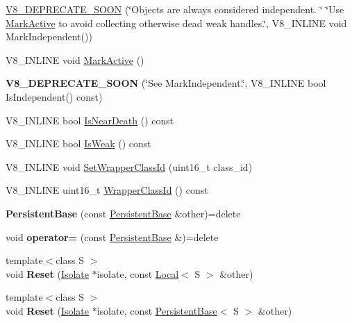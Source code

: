 \begin{DoxyCompactItemize}
\item 
\mbox{\hyperlink{classv8_1_1PersistentBase_a760df2921447e2344ec564d0268d9d1c}{V8\+\_\+\+D\+E\+P\+R\+E\+C\+A\+T\+E\+\_\+\+S\+O\+ON}} (\char`\"{}Objects are always considered independent. \char`\"{} \char`\"{}Use \mbox{\hyperlink{classv8_1_1PersistentBase_a7244edd33a45b7d95e566fce85e3f87d}{Mark\+Active}} to avoid collecting otherwise dead weak handles.\char`\"{}, V8\+\_\+\+I\+N\+L\+I\+NE void Mark\+Independent())
\item 
V8\+\_\+\+I\+N\+L\+I\+NE void \mbox{\hyperlink{classv8_1_1PersistentBase_a7244edd33a45b7d95e566fce85e3f87d}{Mark\+Active}} ()
\item 
\mbox{\label{classv8_1_1PersistentBase_a65a640cf38fa04620eff99b1c4e2d221}} 
{\bfseries V8\+\_\+\+D\+E\+P\+R\+E\+C\+A\+T\+E\+\_\+\+S\+O\+ON} (\char`\"{}See Mark\+Independent.\char`\"{}, V8\+\_\+\+I\+N\+L\+I\+NE bool Is\+Independent() const)
\item 
V8\+\_\+\+I\+N\+L\+I\+NE bool \mbox{\hyperlink{classv8_1_1PersistentBase_a6587b66b7d4c0397129c51d0507b4094}{Is\+Near\+Death}} () const
\item 
V8\+\_\+\+I\+N\+L\+I\+NE bool \mbox{\hyperlink{classv8_1_1PersistentBase_a479c7b146da083aa608e133a7dec79f9}{Is\+Weak}} () const
\item 
V8\+\_\+\+I\+N\+L\+I\+NE void \mbox{\hyperlink{classv8_1_1PersistentBase_ac4c979164b3ed4dc92319e6f5a108d3d}{Set\+Wrapper\+Class\+Id}} (uint16\+\_\+t class\+\_\+id)
\item 
V8\+\_\+\+I\+N\+L\+I\+NE uint16\+\_\+t \mbox{\hyperlink{classv8_1_1PersistentBase_ac81668d70faff8ee84aa6db410b3ce3c}{Wrapper\+Class\+Id}} () const
\item 
\mbox{\label{classv8_1_1PersistentBase_aa403ece93fda904f5d6ab39e9383a504}} 
{\bfseries Persistent\+Base} (const \mbox{\hyperlink{classv8_1_1PersistentBase}{Persistent\+Base}} \&other)=delete
\item 
\mbox{\label{classv8_1_1PersistentBase_ada3d83b8cadaf4b83027baa41cd99d8c}} 
void {\bfseries operator=} (const \mbox{\hyperlink{classv8_1_1PersistentBase}{Persistent\+Base}} \&)=delete
\item 
\mbox{\label{classv8_1_1PersistentBase_ab4b4d3fba3498486f1f10dc7d5be90fc}} 
{\footnotesize template$<$class S $>$ }\\void {\bfseries Reset} (\mbox{\hyperlink{classv8_1_1Isolate}{Isolate}} $\ast$isolate, const \mbox{\hyperlink{classv8_1_1Local}{Local}}$<$ S $>$ \&other)
\item 
\mbox{\label{classv8_1_1PersistentBase_a67cbcedf77d176d3870fa4993e300b61}} 
{\footnotesize template$<$class S $>$ }\\void {\bfseries Reset} (\mbox{\hyperlink{classv8_1_1Isolate}{Isolate}} $\ast$isolate, const \mbox{\hyperlink{classv8_1_1PersistentBase}{Persistent\+Base}}$<$ S $>$ \&other)
\end{DoxyCompactItemize}
